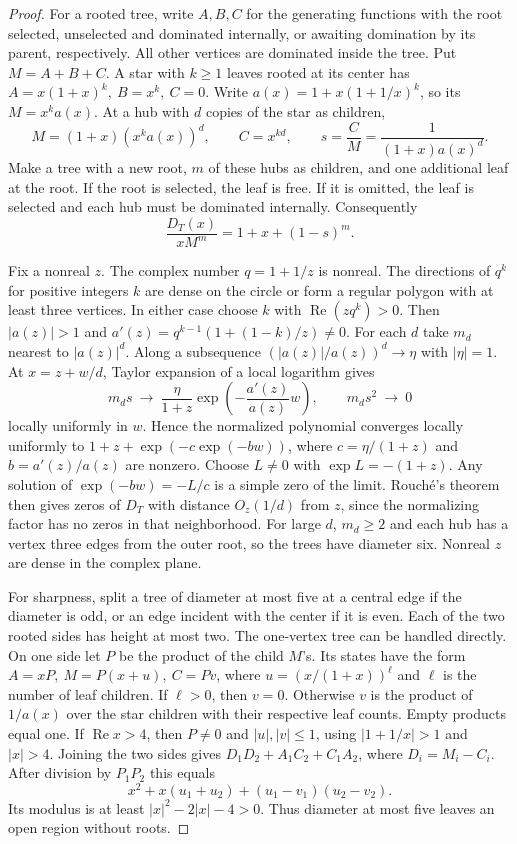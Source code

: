 \documentclass[10pt]{article}
\begin{document}
\begin{proof}
For a rooted tree, write \(A,B,C\) for the generating functions with
the root selected, unselected and dominated internally, or awaiting
domination by its parent, respectively. All other vertices are
dominated inside the tree. Put \(M=A+B+C\). A star with \(k\ge1\)
leaves rooted at its center has \(A=x(1+x)^k,\ B=x^k,\ C=0\).
Write \(a(x)=1+x(1+1/x)^k\), so its \(M=x^ka(x)\).
At a hub with \(d\) copies of the star as children,
\[
M=(1+x)(x^ka(x))^d,\qquad C=x^{kd},\qquad
s=\frac C M=\frac{1}{(1+x)a(x)^d}.
\]
Make a tree with a new root, \(m\) of these hubs as children,
and one additional leaf at the root. If the root is selected,
the leaf is free. If it is omitted, the leaf is selected and
each hub must be dominated internally. Consequently
\[
\frac{D_T(x)}{xM^m}=1+x+(1-s)^m .
\]

Fix a nonreal \(z\). The complex number \(q=1+1/z\) is nonreal.
The directions of \(q^k\) for positive integers \(k\) are dense on
the circle or form a regular polygon with at least three vertices.
In either case choose \(k\) with \(\operatorname{Re}(zq^k)>0\).
Then \(|a(z)|>1\) and \(a'(z)=q^{k-1}(1+(1-k)/z)\ne0\).
For each \(d\) take \(m_d\) nearest to \(|a(z)|^d\). Along a
subsequence \((|a(z)|/a(z))^d\to\eta\) with \(|\eta|=1\).
At \(x=z+w/d\), Taylor expansion of a local logarithm gives
\[
 m_ds\ \longrightarrow\ \frac{\eta}{1+z}
       \exp\!\left(-\frac{a'(z)}{a(z)}w\right),
 \qquad m_ds^2\ \longrightarrow\ 0
\]
locally uniformly in \(w\). Hence the normalized polynomial converges
locally uniformly to \(1+z+\exp(-c\exp(-bw))\), where
\(c=\eta/(1+z)\) and \(b=a'(z)/a(z)\) are nonzero.
Choose \(L\ne0\) with \(\exp L=-(1+z)\).
Any solution of \(\exp(-bw)=-L/c\) is a simple zero of the limit.
Rouch\'e's theorem then gives zeros of \(D_T\) with distance
\(O_z(1/d)\) from \(z\), since the normalizing factor has no zeros in
that neighborhood. For large \(d\), \(m_d\ge2\) and each hub
has a vertex three edges from the outer root, so the trees have
diameter six. Nonreal \(z\) are dense in the complex plane.

For sharpness, split a tree of diameter at most five at a central
edge if the diameter is odd, or an edge incident with the center
if it is even. Each of the two rooted sides has height at most two.
The one-vertex tree can be handled directly. On one side let \(P\)
be the product of the child \(M\)'s. Its states have the form
\(A=xP,\ M=P(x+u),\ C=Pv\), where \(u=(x/(1+x))^\ell\) and
\(\ell\) is the number of leaf children. If \(\ell>0\), then \(v=0\).
Otherwise \(v\) is the product of \(1/a(x)\) over the star children
with their respective leaf counts. Empty products equal one.
If \(\operatorname{Re}x>4\), then \(P\ne0\) and \(|u|,|v|\le1\),
using \(|1+1/x|>1\) and \(|x|>4\).
Joining the two sides gives \(D_1D_2+A_1C_2+C_1A_2\), where
\(D_i=M_i-C_i\). After division by \(P_1P_2\) this equals
\[
x^2+x(u_1+u_2)+(u_1-v_1)(u_2-v_2).
\]
Its modulus is at least \(|x|^2-2|x|-4>0\).
Thus diameter at most five leaves an open region without roots.
\end{proof}
\end{document}
